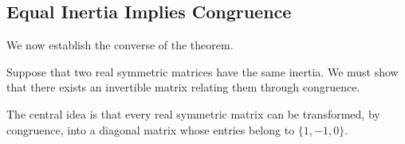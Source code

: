 \documentclass[11pt]{article}
\theoremstyle{definition}
\theoremstyle{remark}
\begin{document}

\subsection{Equal Inertia Implies Congruence}

We now establish the converse of the theorem.

Suppose that two real symmetric matrices
have the same inertia. We must show
that there exists an invertible matrix
relating them through congruence.

The central idea is that every real symmetric
matrix can be transformed, by congruence,
into a diagonal matrix whose entries
belong to $\{1,-1,0\}$.
\end{document}
